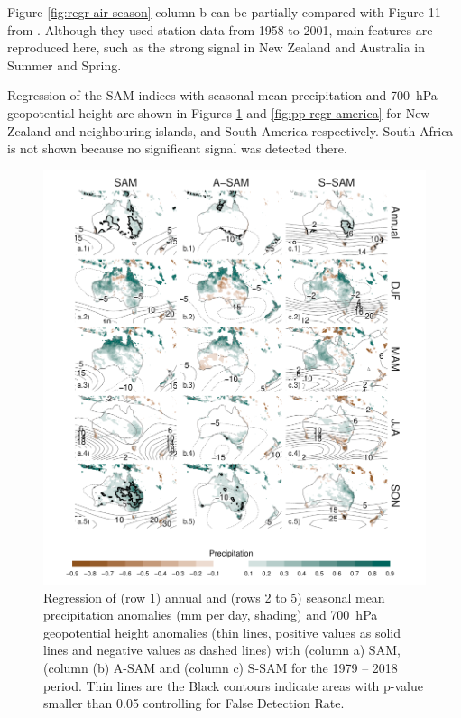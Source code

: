 \documentclass[smallextended]{svjour3}       %
\begin{document}
Figure \ref{fig:regr-air-season} column b can be partially compared with Figure 11 from \citet{fogt2012}. Although they used station data from 1958 to 2001, main features are reproduced here, such as the strong signal in New Zealand and Australia in Summer and Spring.

Regression of the SAM indices with seasonal mean precipitation and 700~hPa geopotential height are shown in Figures \ref{fig:pp-regr-oceania} and \ref{fig:pp-regr-america} for New Zealand and neighbouring islands, and South America respectively. South Africa is not shown because no significant signal was detected there.

\begin{figure}
\includegraphics{pp-regr-oceania-1} \caption{Regression of (row 1) annual and (rows 2 to 5) seasonal mean precipitation anomalies (mm per day, shading) and 700~hPa geopotential height anomalies (thin lines, positive values as solid lines and negative values as dashed lines) with (column a) SAM, (column (b) A\nobreakdash-SAM and (column c) S\nobreakdash-SAM for the 1979 -- 2018 period. Thin lines are the Black contours indicate areas with p-value smaller than 0.05 controlling for False Detection Rate.}\label{fig:pp-regr-oceania}
\end{figure}
\end{document}
